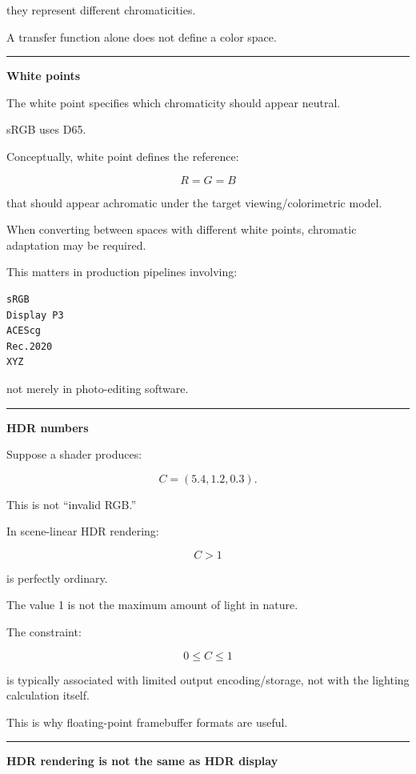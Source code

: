 they represent different chromaticities.

A transfer function alone does not define a color space.

\begin{center}\rule{0.5\linewidth}{0.5pt}\end{center}

\textbf{White points}

The white point specifies which chromaticity should appear neutral.

sRGB uses D65.

Conceptually, white point defines the reference:

\[
R=G=B
\]

that should appear achromatic under the target viewing/colorimetric model.

When converting between spaces with different white points, chromatic adaptation may be required.

This matters in production pipelines involving:

\begin{verbatim}
sRGB
Display P3
ACEScg
Rec.2020
XYZ
\end{verbatim}

not merely in photo-editing software.

\begin{center}\rule{0.5\linewidth}{0.5pt}\end{center}

\textbf{HDR numbers}

Suppose a shader produces:

\[
C=(5.4,1.2,0.3).
\]

This is not ``invalid RGB.''

In scene-linear HDR rendering:

\[
C>1
\]

is perfectly ordinary.

The value 1 is not the maximum amount of light in nature.

The constraint:

\[
0\le C\le1
\]

is typically associated with limited output encoding/storage, not with the lighting calculation itself.

This is why floating-point framebuffer formats are useful.

\begin{center}\rule{0.5\linewidth}{0.5pt}\end{center}

\textbf{HDR rendering is not the same as HDR display}


